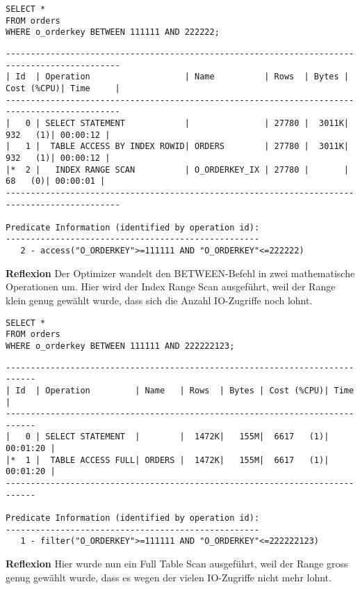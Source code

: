 \documentclass[10pt]{article}
\begin{document}
\begin{lstlisting}[style=sql]
SELECT *
FROM orders
WHERE o_orderkey BETWEEN 111111 AND 222222;
\end{lstlisting}
\begin{lstlisting}[style=queryexecutionplan]
---------------------------------------------------------------------------------------------
| Id  | Operation                   | Name          | Rows  | Bytes | Cost (%CPU)| Time     |
---------------------------------------------------------------------------------------------
|   0 | SELECT STATEMENT            |               | 27780 |  3011K|   932   (1)| 00:00:12 |
|   1 |  TABLE ACCESS BY INDEX ROWID| ORDERS        | 27780 |  3011K|   932   (1)| 00:00:12 |
|*  2 |   INDEX RANGE SCAN          | O_ORDERKEY_IX | 27780 |       |    68   (0)| 00:00:01 |
---------------------------------------------------------------------------------------------

Predicate Information (identified by operation id):
---------------------------------------------------
   2 - access("O_ORDERKEY">=111111 AND "O_ORDERKEY"<=222222)
\end{lstlisting}
\textbf{Reflexion} \newline
Der Optimizer wandelt den BETWEEN-Befehl in zwei mathematische Operationen um.
Hier wird der Index Range Scan ausgeführt, weil der Range klein genug gewählt wurde, dass sich die Anzahl IO-Zugriffe noch lohnt.

\begin{lstlisting}[style=sql]
SELECT *
FROM orders
WHERE o_orderkey BETWEEN 111111 AND 222222123;
\end{lstlisting}
\begin{lstlisting}[style=queryexecutionplan]
----------------------------------------------------------------------------
| Id  | Operation         | Name   | Rows  | Bytes | Cost (%CPU)| Time     |
----------------------------------------------------------------------------
|   0 | SELECT STATEMENT  |        |  1472K|   155M|  6617   (1)| 00:01:20 |
|*  1 |  TABLE ACCESS FULL| ORDERS |  1472K|   155M|  6617   (1)| 00:01:20 |
----------------------------------------------------------------------------

Predicate Information (identified by operation id):
---------------------------------------------------
   1 - filter("O_ORDERKEY">=111111 AND "O_ORDERKEY"<=222222123)
\end{lstlisting}
\textbf{Reflexion} \newline
Hier wurde nun ein Full Table Scan ausgeführt, weil der Range gross genug gewählt wurde, dass es wegen der vielen IO-Zugriffe nicht mehr lohnt.
\end{document}
